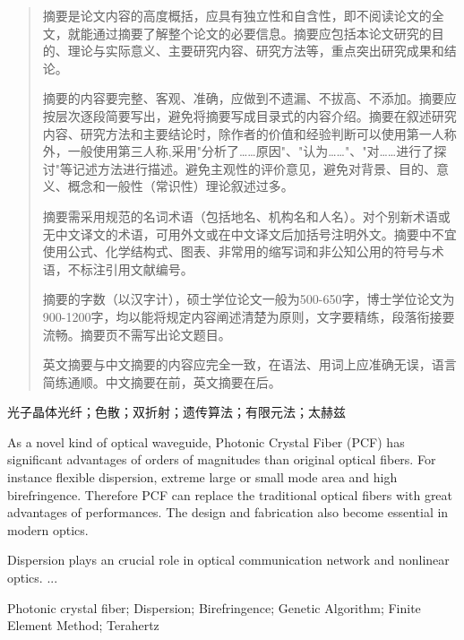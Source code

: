 \begin{abstract}
摘要是论文内容的高度概括，应具有独立性和自含性，即不阅读论文的全文，就能通过摘要了解整个论文的必要信息。摘要应包括本论文研究的目的、理论与实际意义、主要研究内容、研究方法等，重点突出研究成果和结论。

摘要的内容要完整、客观、准确，应做到不遗漏、不拔高、不添加。摘要应按层次逐段简要写出，避免将摘要写成目录式的内容介绍。摘要在叙述研究内容、研究方法和主要结论时，除作者的价值和经验判断可以使用第一人称外，一般使用第三人称,采用"分析了……原因"、"认为……"、"对……进行了探讨"等记述方法进行描述。避免主观性的评价意见，避免对背景、目的、意义、概念和一般性（常识性）理论叙述过多。

摘要需采用规范的名词术语（包括地名、机构名和人名）。对个别新术语或无中文译文的术语，可用外文或在中文译文后加括号注明外文。摘要中不宜使用公式、化学结构式、图表、非常用的缩写词和非公知公用的符号与术语，不标注引用文献编号。

摘要的字数（以汉字计），硕士学位论文一般为500-650字，博士学位论文为900-1200字，均以能将规定内容阐述清楚为原则，文字要精练，段落衔接要流畅。摘要页不需写出论文题目。

英文摘要与中文摘要的内容应完全一致，在语法、用词上应准确无误，语言简练通顺。中文摘要在前，英文摘要在后。

\end{abstract}

\begin{keywords}
光子晶体光纤；色散；双折射；遗传算法；有限元法；太赫兹
\end{keywords}

\cleardoublepage

\begin{englishabstract}
As a novel kind of optical waveguide, Photonic Crystal Fiber (PCF) has significant advantages of orders of magnitudes than original optical fibers. For instance flexible dispersion, extreme large or small mode area and high birefringence. Therefore PCF
can replace the traditional optical fibers with great advantages of  performances. The design and fabrication also become essential in modern optics.

Dispersion plays an crucial role in optical communication network and nonlinear optics. ...
\end{englishabstract}

\begin{englishkeywords}
Photonic crystal fiber; Dispersion; Birefringence; Genetic Algorithm; Finite Element Method; Terahertz
\end{englishkeywords} 

\cleardoublepage